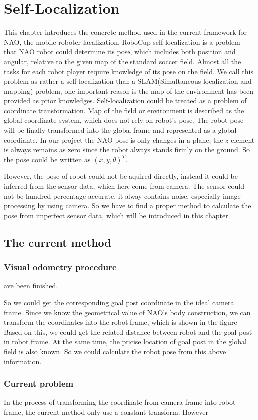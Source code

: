 \chapter{Self-Localization}\label{Chap:PF}
This chapter introduces the concrete method used in the current framework for NAO, the mobile roboter lacalization. RoboCup self-localization is a problem that NAO robot could determine its pose, which includes both position and angular, relative to the given map of the standard soccer field. Almost all the tasks for each robot player require knowledge of its pose on the field. We call this problem as rather a self-localization than a SLAM(Simultaneous localization and mapping) problem, one important reason is the map of the environment has been provided as prior knowledges. Self-localization could be treated as a problem of coordinate transformation. Map of the field or environment is described as the global coordinate system, which does not rely on robot's pose. The robot pose will be finally transformed into the global frame and represented as a global coordiante\cite{thrun2005probabilistic}. In our project the NAO pose is only changes in a plane, the $z$ element is always remains as zero since the robot always stands firmly on the ground. So the pose could be written as $(x,y,\theta)^T$.

However, the pose of robot could not be aquired directly, instead it could be inferred from the sensor data, which here come from camera. The sensor could not be hundred percentage accurate, it alway contains noise, especially image processing by using camera. So we have to find a proper method to calculate the pose from imperfect sensor data, which will be introduced in this chapter.

\clearpage
\section{The current method}
\subsection{Visual odometry procedure}
ave been finished.


So we could get the corresponding goal post coordinate in the ideal camera frame. Since we know the geometrical value of NAO's body construction, we can transform the coordinates into the robot frame, which is shown in the figure %
Based on this, we could get the related distance between robot and the goal post in robot frame. At the same time, the pricise location of goal post in the global field is also known. So we could calculate the robot pose from this above information. %

\subsection{Current problem}
In the process of transforming the coordinate from camera frame into robot frame, the current method only use a constant transform. However
